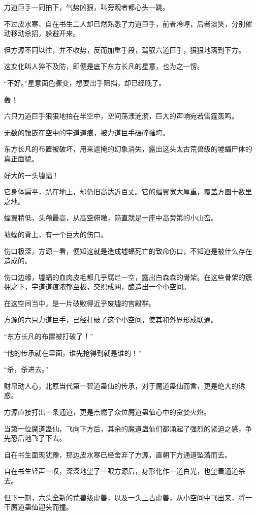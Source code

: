 \begin{this_body}
力道巨手一同拍下，气势凶狠，叫旁观者都心头一跳。

不过皮水寒、自在书生二人却已然熟悉了力道巨手，前者冷哼，后者淡笑，分别催动移动杀招，躲避开来。

但方源不同以往，并不收势，反而加重手段，驾驭六道巨手，狠狠地落到下方。

这变化叫人猝不及防，即便是底下东方长凡的星意，也为之一愣。

“不好。”星意面色骤变，想要出手阻挡，却已经晚了。

轰！

六只力道巨手狠狠地拍在半空中，空间荡漾涟漪，巨大的声响宛若雷霆轰鸣。

无数的镶嵌在空中的宇道道痕，被力道巨手碾碎摧垮。

东方长凡的布置被破坏，用来遮掩的幻象消失，露出这头太古荒兽级的墟蝠尸体的真正面貌。

好大的一头墟蝠！

它身体扁平，趴在地上，却仍旧高达近百丈。它的蝠翼宽大厚重，覆盖方圆十数里之地。

蝠翼稍低，头颅最高，从高空俯瞰，简直就是一座中高旁第的小山峦。

墟蝠的背上，有一个巨大的伤口。

伤口极深，方源一看，便知这就是造成墟蝠死亡的致命伤口，不知道是被什么存在造成的。

伤口边缘，墟蝠的血肉皮毛都几乎腐烂一空，露出白森森的骨架。在这些骨架的簇拥之下，宇道道痕浓郁至极，交织成网，酿造出一个小空间。

在这空间当中，是一片破败得近乎废墟的宫殿群。

方源的六只力道巨手，已经打破了这个小空间，使其和外界形成联通。

“东方长凡的布置被打破了！”

“他的传承就在里面，谁先抢得到就是谁的！”

“杀，杀进去。”

财帛动人心，北原当代第一智道蛊仙的传承，对于魔道蛊仙而言，更是绝大的诱惑。

方源直接打出一条通道，更是点燃了众位魔道蛊仙心中的贪婪火焰。

当第一位魔道蛊仙，飞向下方后，其余的魔道蛊仙们都涌起了强烈的紧迫之感，争先恐后地飞了下去。

自在书生面现犹豫，那边皮水寒已经舍弃了方源，直朝下方通道坠落而去。

自在书生轻声一叹，深深地望了一眼方源后，身形化作一道白光，也望着通道杀去。

但下一刻，六头全新的荒兽级虚兽，以及一头上古虚兽，从小空间中飞出来，将一干魔道蛊仙迎头而撞。


\end{this_body}
